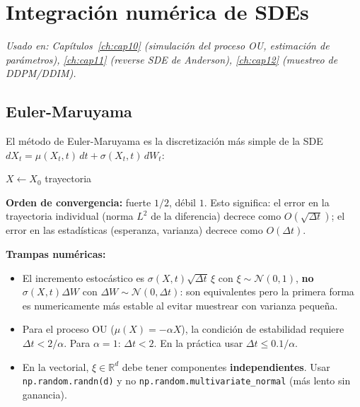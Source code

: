 \section{Integración numérica de SDEs}
\label{sec:ap_sdes}

\textit{Usado en: Capítulos~\ref{ch:cap10} (simulación del proceso OU,
estimación de parámetros), \ref{ch:cap11} (reverse SDE de Anderson),
\ref{ch:cap12} (muestreo de DDPM/DDIM).}

\subsection{Euler-Maruyama}
\label{subsec:ap_euler_maruyama}

El método de Euler-Maruyama es la discretización más simple de la SDE
$dX_t = \mu(X_t,t)\,dt + \sigma(X_t,t)\,dW_t$:

\begin{algorithm}[H]
\caption{Euler-Maruyama para una SDE escalar o vectorial}
\label{alg:ap_em}

$X \leftarrow X_0$\;
\Return trayectoria\;
\end{algorithm}

\noindent\textbf{Orden de convergencia:} fuerte $1/2$, débil $1$.
Esto significa: el error en la trayectoria individual (norma $L^2$ de la
diferencia) decrece como $O(\sqrt{\Delta t})$; el error en las estadísticas
(esperanza, varianza) decrece como $O(\Delta t)$.

\medskip
\noindent\textbf{Trampas numéricas:}
\begin{itemize}
  \item El incremento estocástico es $\sigma(X,t)\sqrt{\Delta t}\,\xi$ con
        $\xi\sim\mathcal{N}(0,1)$, \textbf{no} $\sigma(X,t)\Delta W$ con
        $\Delta W\sim\mathcal{N}(0,\Delta t)$: son equivalentes pero la primera
        forma es numericamente más estable al evitar muestrear con varianza
        pequeña.
  \item Para el proceso OU ($\mu(X) = -\alpha X$), la condición de estabilidad
        requiere $\Delta t < 2/\alpha$. Para $\alpha = 1$: $\Delta t < 2$. En
        la práctica usar $\Delta t \leq 0.1/\alpha$.
  \item En la vectorial, $\xi\in\mathbb{R}^d$ debe tener componentes
        \textbf{independientes}. Usar \texttt{np.random.randn(d)} y no
        \texttt{np.random.multivariate\_normal} (más lento sin ganancia).
\end{itemize}

